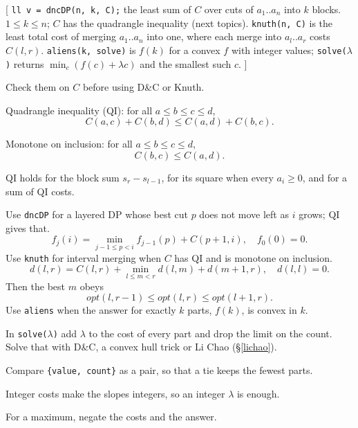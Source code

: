 [
	 \texttt{ll v = dncDP(n, k, C);}
	 the least sum of $C$ over cuts of $a_1..a_n$ into $k$ blocks.
	 $1 \le k \le n$; $C$ has the quadrangle inequality (next topics).
	 \texttt{knuth(n, C)} is the least total cost of merging $a_1..a_n$ into one, where each merge into $a_l..a_r$ costs $C(l, r)$.
	 \texttt{aliens(k, solve)} is $f(k)$ for a convex $f$ with integer values; \texttt{solve($\lambda$)} returns $\min_c (f(c) + \lambda c)$ and the smallest such $c$.
]\label{dpopt}
{\footnotesize\tightdisplay
{}
Check them on $C$ before using D\&C or Knuth.
\begin{facts}
	\item Quadrangle inequality (QI): for all $a \le b \le c \le d$,
	\[ C(a, c) + C(b, d) \le C(a, d) + C(b, c). \]
	\item Monotone on inclusion: for all $a \le b \le c \le d$,
	\[ C(b, c) \le C(a, d). \]
	\item QI holds for the block sum $s_r - s_{l-1}$, for its square when every $a_i \ge 0$, and for a sum of QI costs.
\end{facts}
Use \texttt{dncDP} for a layered DP whose best cut $p$ does not move left as $i$ grows; QI gives that.
\[ f_j(i) = \min_{j-1 \le p < i} f_{j-1}(p) + C(p+1, i), \quad f_0(0) = 0. \]
Use \texttt{knuth} for interval merging when $C$ has QI and is monotone on inclusion.
\[ d(l, r) = C(l, r) + \min_{l \le m < r} d(l, m) + d(m+1, r), \quad d(l, l) = 0. \]
Then the best $m$ obeys
\[ opt(l, r-1) \le opt(l, r) \le opt(l+1, r). \]
Use \texttt{aliens} when the answer for exactly $k$ parts, $f(k)$, is convex in $k$.
\begin{facts}
	\item In \texttt{solve($\lambda$)} add $\lambda$ to the cost of every part and drop the limit on the count. Solve that with D\&C, a convex hull trick or Li Chao (\S\ref{lichao}).
	\item Compare \texttt{\{value, count\}} as a pair, so that a tie keeps the fewest parts.
	\item Integer costs make the slopes integers, so an integer $\lambda$ is enough.
	\item For a maximum, negate the costs and the answer.
\end{facts}
}
\label{techniques}
